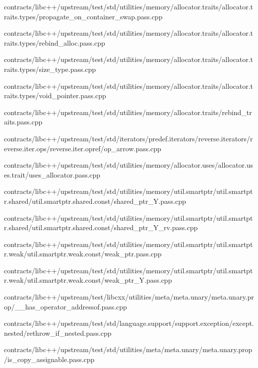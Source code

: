 \begin{DoxyCompactItemize}
contracts/libc++/upstream/test/std/utilities/memory/allocator.\+traits/allocator.\+traits.\+types/propagate\+\_\+on\+\_\+container\+\_\+swap.\+pass.\+cpp\item 
contracts/libc++/upstream/test/std/utilities/memory/allocator.\+traits/allocator.\+traits.\+types/rebind\+\_\+alloc.\+pass.\+cpp\item 
contracts/libc++/upstream/test/std/utilities/memory/allocator.\+traits/allocator.\+traits.\+types/size\+\_\+type.\+pass.\+cpp\item 
contracts/libc++/upstream/test/std/utilities/memory/allocator.\+traits/allocator.\+traits.\+types/void\+\_\+pointer.\+pass.\+cpp\item 
contracts/libc++/upstream/test/std/utilities/memory/allocator.\+traits/rebind\+\_\+traits.\+pass.\+cpp\item 
contracts/libc++/upstream/test/std/iterators/predef.\+iterators/reverse.\+iterators/reverse.\+iter.\+ops/reverse.\+iter.\+opref/op\+\_\+arrow.\+pass.\+cpp\item 
contracts/libc++/upstream/test/std/utilities/memory/allocator.\+uses/allocator.\+uses.\+trait/uses\+\_\+allocator.\+pass.\+cpp\item 
contracts/libc++/upstream/test/std/utilities/memory/util.\+smartptr/util.\+smartptr.\+shared/util.\+smartptr.\+shared.\+const/shared\+\_\+ptr\+\_\+\+Y.\+pass.\+cpp\item 
contracts/libc++/upstream/test/std/utilities/memory/util.\+smartptr/util.\+smartptr.\+shared/util.\+smartptr.\+shared.\+const/shared\+\_\+ptr\+\_\+\+Y\+\_\+rv.\+pass.\+cpp\item 
contracts/libc++/upstream/test/std/utilities/memory/util.\+smartptr/util.\+smartptr.\+weak/util.\+smartptr.\+weak.\+const/weak\+\_\+ptr.\+pass.\+cpp\item 
contracts/libc++/upstream/test/std/utilities/memory/util.\+smartptr/util.\+smartptr.\+weak/util.\+smartptr.\+weak.\+const/weak\+\_\+ptr\+\_\+\+Y.\+pass.\+cpp\item 
contracts/libc++/upstream/test/libcxx/utilities/meta/meta.\+unary/meta.\+unary.\+prop/\+\_\+\+\_\+has\+\_\+operator\+\_\+addressof.\+pass.\+cpp\item 
contracts/libc++/upstream/test/std/language.\+support/support.\+exception/except.\+nested/rethrow\+\_\+if\+\_\+nested.\+pass.\+cpp\item 
contracts/libc++/upstream/test/std/utilities/meta/meta.\+unary/meta.\+unary.\+prop/is\+\_\+copy\+\_\+assignable.\+pass.\+cpp\item 

\end{DoxyCompactItemize}
